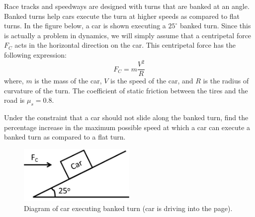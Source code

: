 
Race tracks and speedways are designed with turns that are banked at an angle. Banked turns help cars execute the turn at higher speeds as compared to flat turns. In the figure below, a car is shown executing a $25^\circ$ banked turn. Since this is actually a problem in dynamics, we will simply assume that a centripetal force $F_C$ acts in the horizontal direction on the car. This centripetal force has the following expression:
\begin{equation*}
  F_C = m\frac{V^2}{R}
\end{equation*}
where, $m$ is the mass of the car, $V$ is the speed of the car, and $R$ is the radius of curvature of the turn. The coefficient of static friction between the tires and the road is $\mu_s = 0.8$.

Under the constraint that a car should not slide along the banked turn, find the percentage increase in the maximum possible speed at which a car can execute a banked turn as compared to a flat turn.

\begin{figure}[ht!]
  \centering
  \includegraphics[width=0.5\textwidth,
	           height=0.4\textheight,
		   keepaspectratio]{fig.png}
       \caption*{Diagram of car executing banked turn (car is driving into the page).}
\end{figure}

